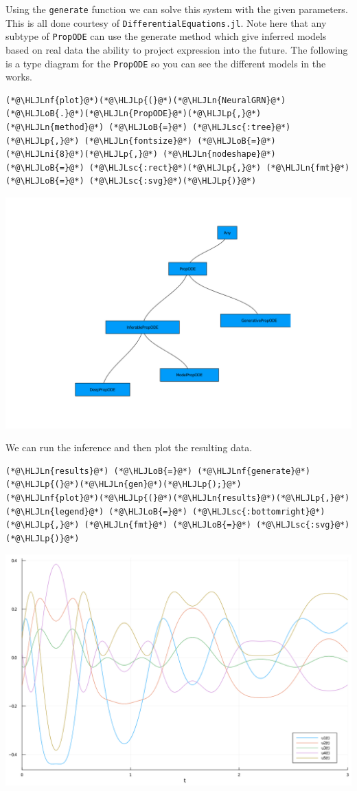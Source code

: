\documentclass[12pt,a4paper]{article}
\newcommand{\HLJLn}[1]{#1}
\newcommand{\HLJLnf}[1]{\textcolor[RGB]{66,102,213}{#1}}
\newcommand{\HLJLsc}[1]{\textcolor[RGB]{201,61,57}{#1}}
\newcommand{\HLJLni}[1]{\textcolor[RGB]{59,151,46}{#1}}
\newcommand{\HLJLoB}[1]{\textcolor[RGB]{102,102,102}{\textbf{#1}}}
\newcommand{\HLJLp}[1]{#1}
\begin{document}
Using the \texttt{generate} function we can solve this system with the given parameters. This is all done courtesy of \texttt{DifferentialEquations.jl}. Note here that any subtype of \texttt{PropODE} can use the generate method which give inferred models based on real data the ability to project expression into the future. The following is a type diagram for the \texttt{PropODE} so you can see the different models in the works.


\begin{lstlisting}
(*@\HLJLnf{plot}@*)(*@\HLJLp{(}@*)(*@\HLJLn{NeuralGRN}@*)(*@\HLJLoB{.}@*)(*@\HLJLn{PropODE}@*)(*@\HLJLp{,}@*) (*@\HLJLn{method}@*) (*@\HLJLoB{=}@*) (*@\HLJLsc{:tree}@*)(*@\HLJLp{,}@*) (*@\HLJLn{fontsize}@*) (*@\HLJLoB{=}@*) (*@\HLJLni{8}@*)(*@\HLJLp{,}@*) (*@\HLJLn{nodeshape}@*) (*@\HLJLoB{=}@*) (*@\HLJLsc{:rect}@*)(*@\HLJLp{,}@*) (*@\HLJLn{fmt}@*) (*@\HLJLoB{=}@*) (*@\HLJLsc{:svg}@*)(*@\HLJLp{)}@*)
\end{lstlisting}

\includegraphics[width=\linewidth]{jl_IBhjS5/generative_4_1.png}

We can run the inference and then plot the resulting data.


\begin{lstlisting}
(*@\HLJLn{results}@*) (*@\HLJLoB{=}@*) (*@\HLJLnf{generate}@*)(*@\HLJLp{(}@*)(*@\HLJLn{gen}@*)(*@\HLJLp{);}@*)
(*@\HLJLnf{plot}@*)(*@\HLJLp{(}@*)(*@\HLJLn{results}@*)(*@\HLJLp{,}@*) (*@\HLJLn{legend}@*) (*@\HLJLoB{=}@*) (*@\HLJLsc{:bottomright}@*)(*@\HLJLp{,}@*) (*@\HLJLn{fmt}@*) (*@\HLJLoB{=}@*) (*@\HLJLsc{:svg}@*)(*@\HLJLp{)}@*)
\end{lstlisting}

\includegraphics[width=\linewidth]{jl_IBhjS5/generative_5_1.png}
\end{document}
